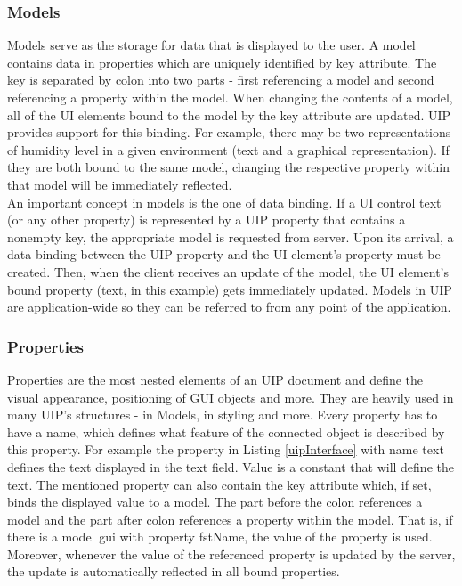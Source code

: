 \subsubsection{Models}
\label{subsec:models}
Models serve as the storage for data that is displayed to the user. A model contains data in properties which are uniquely identified by key attribute. The key is separated by colon into two parts - first referencing a model and second referencing a property within the model. When changing the contents of a model, all of the UI elements bound to the model by the key attribute are updated. UIP provides support for this binding. For example, there may be two representations of humidity level in a given environment (text and a graphical representation). If they are both bound to the same model, changing the respective property within that model will be immediately reflected.\\
An important concept in models is the one of data binding. If a UI control text (or any other property) is represented by a UIP property that contains a nonempty key, the appropriate model is requested from server. Upon its arrival, a data binding between the UIP property and the UI element's property must be created. Then, when the client receives an update of the model, the UI element's bound property (text, in this example) gets immediately updated. Models in UIP are application-wide so they can be referred to from any point of the application.

\subsubsection{Properties}
Properties are the most nested elements of an UIP document and define the visual appearance, positioning of GUI objects and more. They are heavily used in many UIP's structures - in Models, in styling and more. Every property has to have a name, which defines what feature of the connected object is described by this property. For example the property in Listing \ref{uipInterface} with name text defines the text displayed in the text field. Value is a constant that will define the text. The mentioned property can also contain the key attribute which, if set, binds the displayed value to a model. The part before the colon references a model and the part after colon references a property within the model. That is, if there is a model gui with property fstName, the value of the property is used. Moreover, whenever the value of the referenced property is updated by the server, the update is automatically reflected in all bound properties.

\endinput